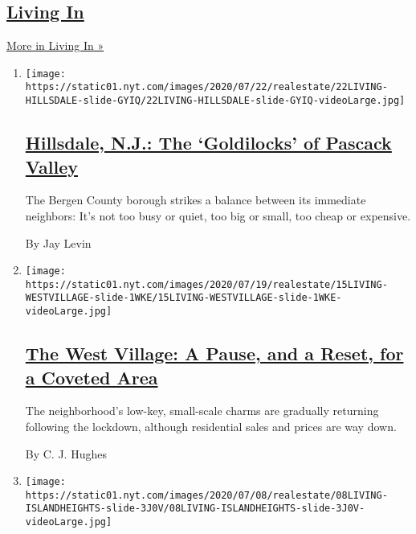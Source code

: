 \hypertarget{living-in-1}{%
\subsection{\texorpdfstring{\href{/column/living-in}{Living
In}}{Living In}}\label{living-in-1}}

\href{/column/living-in}{More in Living In »}

\begin{enumerate}
\def\labelenumi{\arabic{enumi}.}
\item
  \texttt{[image: https://static01.nyt.com/images/2020/07/22/realestate/22LIVING-HILLSDALE-slide-GYIQ/22LIVING-HILLSDALE-slide-GYIQ-videoLarge.jpg]}

  \hypertarget{hillsdale-nj-the-goldilocks-of-pascack-valley}{%
  \subsection{\texorpdfstring{\href{/2020/07/22/realestate/hillsdale-nj-pascack-valley.html}{Hillsdale,
  N.J.: The `Goldilocks' of Pascack
  Valley}}{Hillsdale, N.J.: The `Goldilocks' of Pascack Valley}}\label{hillsdale-nj-the-goldilocks-of-pascack-valley}}

  The Bergen County borough strikes a balance between its immediate
  neighbors: It's not too busy or quiet, too big or small, too cheap or
  expensive.

  By Jay Levin
\item
  \texttt{[image: https://static01.nyt.com/images/2020/07/19/realestate/15LIVING-WESTVILLAGE-slide-1WKE/15LIVING-WESTVILLAGE-slide-1WKE-videoLarge.jpg]}

  \hypertarget{the-west-village-a-pause-and-a-reset-for-a-coveted-area}{%
  \subsection{\texorpdfstring{\href{/2020/07/15/realestate/west-village-nyc.html}{The
  West Village: A Pause, and a Reset, for a Coveted
  Area}}{The West Village: A Pause, and a Reset, for a Coveted Area}}\label{the-west-village-a-pause-and-a-reset-for-a-coveted-area}}

  The neighborhood's low-key, small-scale charms are gradually returning
  following the lockdown, although residential sales and prices are way
  down.

  By C. J. Hughes
\item
  \texttt{[image: https://static01.nyt.com/images/2020/07/08/realestate/08LIVING-ISLANDHEIGHTS-slide-3J0V/08LIVING-ISLANDHEIGHTS-slide-3J0V-videoLarge.jpg]}


\end{enumerate}
